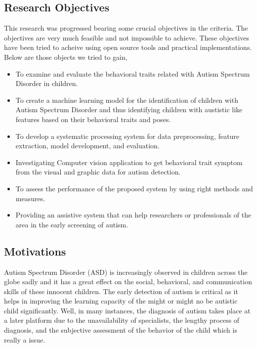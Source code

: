 \subsection{Research Objectives}
This research was progressed bearing some crucial objectives in the criteria. The objectives are very much feasible and not impossible to achieve. These objectives have been tried to acheive using open source tools and practical implementations. Below are those objects we tried to gain,
\begin{itemize}
    \item To examine and evaluate the behavioral traits related with Autism Spectrum Disorder in children.
    
    \item To create a machine learning model for the identification of children with Autism Spectrum Disorder and thus identifying children with austistic like features based on their behavioral traits and poses.
    
    \item To develop a systematic processing system for data preprocessing, feature extraction, model development, and evaluation.
    
    \item Investigating Computer vision application to get behavioral trait symptom from the visual and graphic data for autism detection.
    
    \item To assess the performance of the proposed system by using right methods and measures.
    
    \item Providing an assistive system that can help researchers or professionals of the area in the early screening of autism.
\end{itemize}


 
\subsection{Motivations}
Autism Spectrum Disorder (ASD) is increasingly observed in children across the globe sadly and it has a great effect on the social, behavioral, and communication skills of these innocent children. The early detection of autism is critical as it helps in improving the learning capacity of the might or might no be autistic child significantly. Well, in many instances, the diagnosis of autism takes place at a later platform due to the unavailability of specialists, the lengthy process of diagnosis, and the subjective assessment of the behavior of the child which is really a issue.

